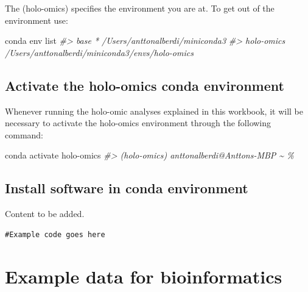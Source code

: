 \documentclass[
]{book}
\newenvironment{Shaded}{\begin{snugshade}}{\end{snugshade}}
\newcommand{\CommentTok}[1]{\textcolor[rgb]{0.56,0.35,0.01}{\textit{#1}}}
\newcommand{\ExtensionTok}[1]{#1}
\newcommand{\NormalTok}[1]{#1}
\begin{document}
The (holo-omics) specifies the environment you are at. To get out of the environment use:

\begin{Shaded}
\begin{Highlighting}[]
\ExtensionTok{conda}\NormalTok{ env list}
\CommentTok{\#\textgreater{} base                  *  /Users/anttonalberdi/miniconda3}
\CommentTok{\#\textgreater{} holo{-}omics               /Users/anttonalberdi/miniconda3/envs/holo{-}omics}
\end{Highlighting}
\end{Shaded}

\hypertarget{activate-the-holo-omics-conda-environment}{%
\subsection*{Activate the holo-omics conda environment}\label{activate-the-holo-omics-conda-environment}}

Whenever running the holo-omic analyses explained in this workbook, it will be necessary to activate the holo-omics environment through the following command:

\begin{Shaded}
\begin{Highlighting}[]
\ExtensionTok{conda}\NormalTok{ activate holo{-}omics}
\CommentTok{\#\textgreater{} (holo{-}omics) anttonalberdi@Anttons{-}MBP \textasciitilde{} \%}
\end{Highlighting}
\end{Shaded}

\hypertarget{install-software-in-conda-environment}{%
\subsection*{Install software in conda environment}\label{install-software-in-conda-environment}}

Content to be added.

\begin{verbatim}
#Example code goes here
\end{verbatim}

\hypertarget{example-data-bioinformatics}{%
\section{Example data for bioinformatics}\label{example-data-bioinformatics}}
\end{document}
